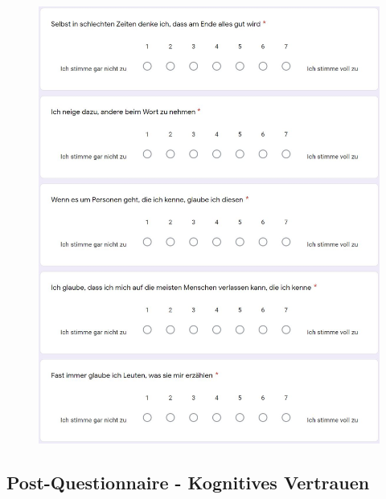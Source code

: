 \documentclass[a4paper,11pt]{article}%
\renewcommand{\\}{\vspace*{0.5\baselineskip} \newline}
\begin{document}
{{	\begin{figure}[H]
	\centering
		\begin{footnotesize}
			\includegraphics[scale=0.6]{Abbildungen/Fragebogen/Post-Questionnaire/PQG4}
		\end{footnotesize}
	\end{figure}	

\newpage
\subsection{Post-Questionnaire - Kognitives Vertrauen}	
\label{Post-Questionnaire - Kognitives Vertrauen}	

}}
\end{document}
